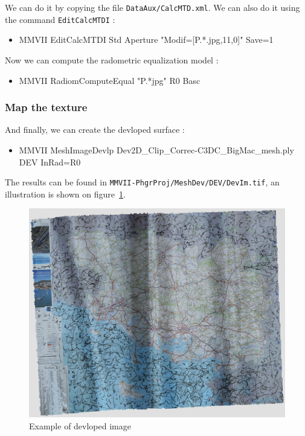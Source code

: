 We can do it by copying the file {\tt DataAux/CalcMTD.xml}. We can also
do it using the command {\tt EditCalcMTDI} :

\begin{itemize}
      \item {MMVII  EditCalcMTDI Std Aperture "Modif=[P.*.jpg,11,0]"  Save=1}
\end{itemize}

Now we can compute the radometric equalization model :

\begin{itemize}
     \item {MMVII RadiomComputeEqual "P.*jpg" R0 Basc}
\end{itemize}



\subsubsection{Map the texture}

And finally, we can create the devloped surface :


\begin{itemize}
	\item {MMVII MeshImageDevlp Dev2D\_Clip\_Correc-C3DC\_BigMac\_mesh.ply  DEV InRad=R0}
\end{itemize}

The results can be found in {\tt MMVII-PhgrProj/MeshDev/DEV/DevIm.tif}, an illustration is shown on figure~\ref{fig:TutDI:DevIm}.


\begin{figure}
\centering
	\includegraphics[width=12 cm]{Tutorial/Images/DevIm.jpg}
	\caption{Example of devloped image}
\label{fig:TutDI:DevIm}
\end{figure}



